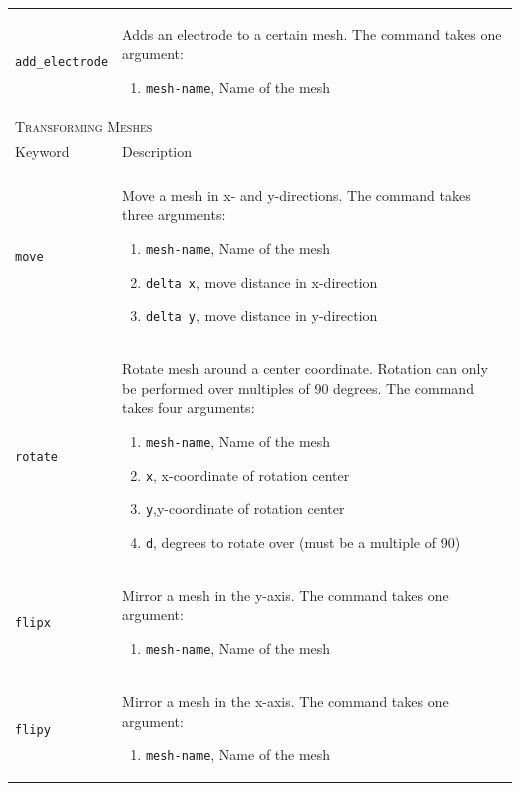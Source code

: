 \documentclass[noshowpacs,preprintnumbers,amsmath,amssymb, letter]{revtex4}
\begin{document}
\begin{longtable}{p{}p{}}
\texttt{add\_electrode}	& Adds an electrode to a certain mesh. The command takes one argument:
\begin{enumerate}
\item \texttt{mesh-name}, Name of the mesh
\end{enumerate}\\
\multicolumn{2}{l}{\textsc{Transforming Meshes}} \\*
\hline
Keyword & Description \\
\hline\\
\texttt{move} 	& Move a mesh in x- and y-directions. The command takes three arguments:
\begin{enumerate}
\item \texttt{mesh-name}, Name of the mesh
\item \texttt{delta x}, move distance in x-direction
\item \texttt{delta y}, move distance in y-direction
\end{enumerate}\\
\texttt{rotate} 	& Rotate mesh around a center coordinate. Rotation can only be performed over multiples of 90 degrees. The command takes four arguments:
\begin{enumerate}
\item \texttt{mesh-name}, Name of the mesh
\item \texttt{x}, x-coordinate of rotation center
\item \texttt{y},y-coordinate of rotation center
\item \texttt{d}, degrees to rotate over (must be a multiple of 90)
\end{enumerate}\\
\texttt{flipx} 	& Mirror a mesh in the y-axis. The command takes one argument:
\begin{enumerate}
\item \texttt{mesh-name}, Name of the mesh
\end{enumerate}\\
\texttt{flipy} & Mirror a mesh in the x-axis. The command takes one argument:
\begin{enumerate}
\item \texttt{mesh-name}, Name of the mesh

\end{enumerate}
\end{longtable}
\end{document}
